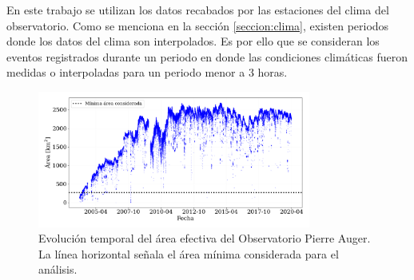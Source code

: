 En este trabajo se utilizan los datos recabados por las estaciones del clima del observatorio. Como se menciona en la sección \ref{seccion:clima}, existen periodos donde los datos del clima son interpolados. Es por ello que se consideran los eventos registrados durante un periodo en donde las condiciones climáticas fueron medidas o interpoladas para un periodo menor a 3 horas.

\begin{figure}[H]
    \centering
    \includegraphics[width=0.8\textwidth]{Graphs/clima/area_v2.png}
    \caption{Evolución temporal del área efectiva del Observatorio Pierre Auger. La línea horizontal señala el área mínima considerada para el análisis.}
    \label{fig:area}
\end{figure}


